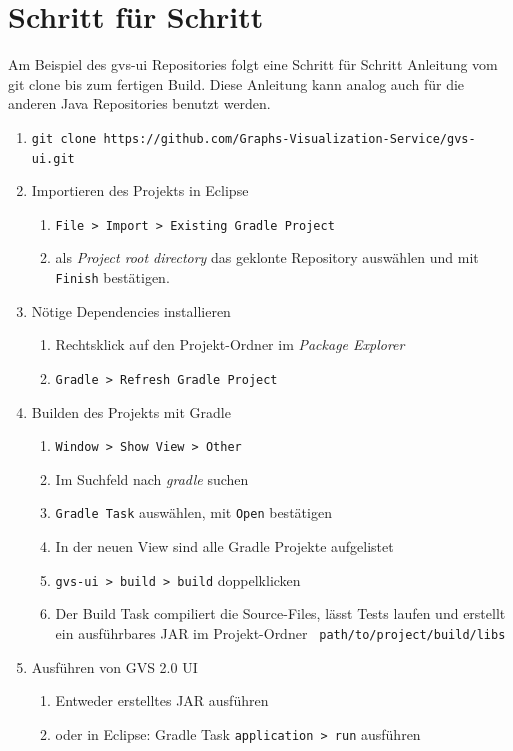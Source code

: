 \documentclass[11pt,a4paper,english,oneside]{book}
\numberwithin{equation}{chapter}
\begin{document}
	\section{Schritt für Schritt}
	Am Beispiel des gvs-ui Repositories folgt eine Schritt für Schritt Anleitung vom git clone bis zum fertigen Build. Diese Anleitung kann analog auch für die anderen Java Repositories benutzt werden.
	
	\begin{enumerate}
		\item \lstinline{git clone https://github.com/Graphs-Visualization-Service/gvs-ui.git}
		\item Importieren des Projekts in Eclipse
		\begin{enumerate}
			\item \lstinline{File > Import > Existing Gradle Project}
			\item als \textit{Project root directory} das geklonte Repository auswählen und mit \lstinline{Finish} bestätigen.
		\end{enumerate}
		\item Nötige Dependencies installieren
		\begin{enumerate}
			\item Rechtsklick auf den Projekt-Ordner im \textit{Package Explorer}
			\item \lstinline{Gradle > Refresh Gradle Project}
		\end{enumerate}
		\item Builden des Projekts mit Gradle
		\begin{enumerate}
			\item \lstinline{Window > Show View > Other}
			\item Im Suchfeld nach \textit{gradle} suchen
			\item \lstinline{Gradle Task} auswählen, mit \lstinline{Open} bestätigen
			\item In der neuen View sind alle Gradle Projekte aufgelistet
			\item \lstinline{gvs-ui > build > build} doppelklicken
			\item Der Build Task compiliert die Source-Files, lässt Tests laufen und erstellt ein ausführbares JAR im Projekt-Ordner \lstinline{ path/to/project/build/libs}
		\end{enumerate}
		\item Ausführen von GVS 2.0 UI
		\begin{enumerate}
			\item Entweder erstelltes JAR ausführen
			\item oder in Eclipse: Gradle Task \lstinline{application > run} ausführen
		\end{enumerate}
	\end{enumerate}
	
\end{document}

